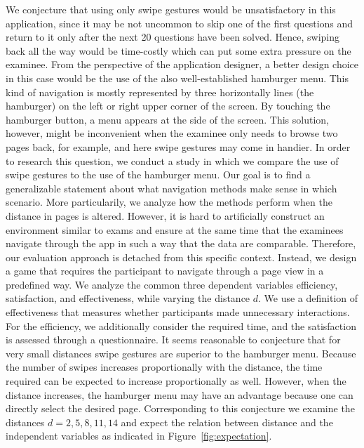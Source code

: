\documentclass{sig-alternate-05-2015}
\begin{document}
We conjecture that using only swipe gestures would be unsatisfactory in this application, since it may be not uncommon to skip one of the first questions and
return to it only after the next 20 questions have been solved. Hence, swiping back all the way would be time-costly which can put some extra pressure on the examinee.
From the perspective of the application designer, a better design choice in this case would be the use of the also well-established hamburger menu. 
This kind of navigation is mostly represented by three horizontally lines (the hamburger) on the left or right upper corner of the screen.
By touching the hamburger button, a menu appears at the side of the screen. This solution, however, might be inconvenient when the examinee only needs to browse two pages back, for example,
and here swipe gestures may come in handier.
In order to research this question, we conduct a study in which we compare the use of swipe gestures to the use of the hamburger menu.
Our goal is to find a generalizable statement about what navigation methods make sense in which scenario. More particularily, we analyze how the methods perform when the
distance in pages is altered.
However, it is hard to artificially construct an environment similar to exams and ensure at the same time that the examinees navigate through the app
in such a way that the data are comparable. Therefore, our evaluation approach is detached from this specific context. Instead, we design a game that requires the participant to
navigate through a page view in a predefined way. 
We analyze the common three dependent variables efficiency, satisfaction, and effectiveness, while varying the distance $d$.
We use a definition of effectiveness that measures whether participants made unnecessary interactions. For the efficiency, we additionally consider the required time, and the satisfaction
is assessed through a questionnaire.
It seems reasonable to conjecture that for very small distances swipe gestures are superior to the hamburger
menu. Because the number of swipes increases proportionally with the distance, the time required can be expected to increase 
proportionally as well. However, when the distance increases, the hamburger menu
may have an advantage because one can directly select the desired page. Corresponding to this conjecture we examine the distances $d = 2, 5, 8, 11, 14$ and
expect the relation between distance and the independent variables as indicated in Figure~\ref{fig:expectation}.
\end{document}
